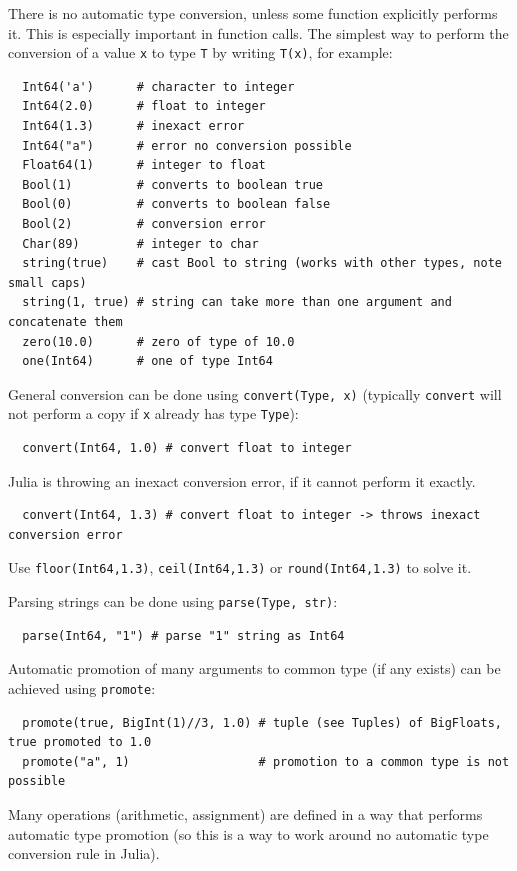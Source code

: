 \documentclass[10pt,a4paper]{article}
\begin{document}
There is no automatic type conversion, unless some function explicitly performs
it. This is especially important in function calls. The simplest way to perform
the conversion of a value \lstinline|x| to type \lstinline|T| by writing
\lstinline|T(x)|, for example:
\begin{lstlisting}
  Int64('a')      # character to integer
  Int64(2.0)      # float to integer
  Int64(1.3)      # inexact error
  Int64("a")      # error no conversion possible
  Float64(1)      # integer to float
  Bool(1)         # converts to boolean true
  Bool(0)         # converts to boolean false
  Bool(2)         # conversion error
  Char(89)        # integer to char
  string(true)    # cast Bool to string (works with other types, note small caps)
  string(1, true) # string can take more than one argument and concatenate them
  zero(10.0)      # zero of type of 10.0
  one(Int64)      # one of type Int64
\end{lstlisting}
General conversion can be done using \lstinline|convert(Type, x)| (typically
\lstinline|convert| will not perform a copy if \lstinline|x| already has type
\lstinline|Type|):
\begin{lstlisting}
  convert(Int64, 1.0) # convert float to integer
\end{lstlisting}
Julia is throwing an inexact conversion error, if it cannot perform it exactly.
\begin{lstlisting}
  convert(Int64, 1.3) # convert float to integer -> throws inexact conversion error
\end{lstlisting}
Use \lstinline|floor(Int64,1.3)|, \lstinline|ceil(Int64,1.3)| or \lstinline|round(Int64,1.3)| to solve it.

Parsing strings can be done using \lstinline|parse(Type, str)|:
\begin{lstlisting}
  parse(Int64, "1") # parse "1" string as Int64
\end{lstlisting}
Automatic promotion of many arguments to common type (if any exists) can be
achieved using \lstinline|promote|:
\begin{lstlisting}
  promote(true, BigInt(1)//3, 1.0) # tuple (see Tuples) of BigFloats, true promoted to 1.0
  promote("a", 1)                  # promotion to a common type is not possible
\end{lstlisting}
Many operations (arithmetic, assignment) are defined in a way that performs
automatic type promotion (so this is a way to work around no automatic type
conversion rule in Julia).
\end{document}
